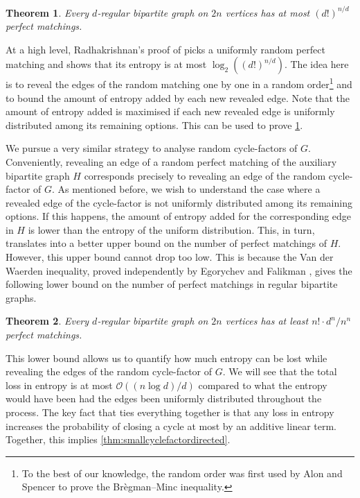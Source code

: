 \documentclass[11pt]{article}
\theoremstyle{plain}
\newtheorem{theorem}{Theorem}[section]
\theoremstyle{definition}
\newcommand{\cO}{\mathcal O}
\newcommand{\logt}{\log_2}
\begin{document}
\begin{theorem}\label{thm:bregmanmincbipperfmat}
    Every $d$-regular bipartite graph on $2 n$ vertices has at most $(d!)^{n/d}$ perfect matchings.
\end{theorem}

At a high level, Radhakrishnan's proof of  picks a uniformly random perfect matching and shows that its entropy is at most $\logt((d!)^{n/d})$. The idea here is to reveal the edges of the random matching one by one in a random order\footnote{To the best of our knowledge, the random order was first used by Alon and Spencer \cite{alon2016probabilistic} to prove the Br\`{e}gman--Minc inequality.} and to bound the amount of entropy added by each new revealed edge. Note that the amount of entropy added is maximised if each new revealed edge is uniformly distributed among its remaining options. This can be used to prove \cref{thm:bregmanmincbipperfmat}.

We pursue a very similar strategy to analyse random cycle-factors of $G$. Conveniently, revealing an edge of a random perfect matching of the auxiliary bipartite graph $H$ corresponds precisely to revealing an edge of the random cycle-factor of $G$. As mentioned before, we wish to understand the case where a revealed edge of the cycle-factor is not uniformly distributed among its remaining options. If this happens, the amount of entropy added for the corresponding edge in $H$ is lower than the entropy of the uniform distribution. This, in turn, translates into a better upper bound on the number of perfect matchings of $H$. However, this upper bound cannot drop too low. This is because the Van der Waerden inequality, proved independently by Egorychev \cite{egorychev1981solution} and Falikman \cite{falikman1981proof}, gives the following lower bound on the number of perfect matchings in regular bipartite graphs.

\begin{theorem}\label{thm:vanderwaerdenbipperfmat}
    Every $d$-regular bipartite graph on $2 n$ vertices has at least $n! \cdot d^n / n^n$ perfect matchings.
\end{theorem}

This lower bound allows us to quantify how much entropy can be lost while revealing the edges of the random cycle-factor of $G$. We will see that the total loss in entropy is at most $\cO((n\log d)/d)$ compared to what the entropy would have been had the edges been uniformly distributed throughout the process. The key fact that ties everything together is that any loss in entropy increases the probability of closing a cycle at most by an additive linear term. Together, this implies \cref{thm:smallcyclefactordirected}.
\end{document}
